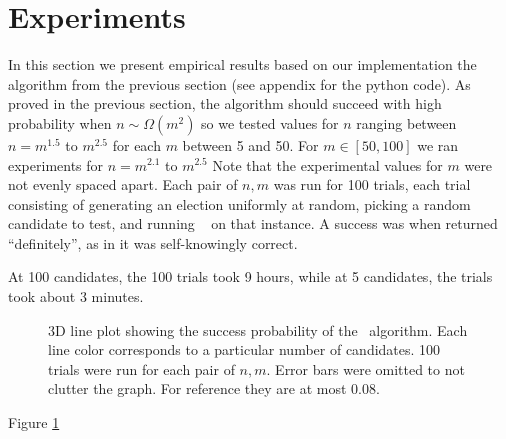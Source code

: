 \section{Experiments}

In this section we present empirical results based on our
implementation the ~ algorithm from the previous section (see appendix for
the python code).
As proved in the previous section, the algorithm should succeed with high
probability when $n \sim \Omega(m^2)$ so we tested values for $n$ ranging between
$n = m^{1.5}$ to $m^{2.5}$ for each $m$ between 5 and 50.
For $m \in [50,100]$ we ran experiments for $n = m^{2.1}$ to $m^{2.5}$
Note that the experimental values for $m$ were not evenly spaced apart.
Each pair of $n,m$ was run for 100 trials, each trial consisting of generating
an election uniformly at random, picking a random candidate to test, and running ~ on that
instance.
A success was when returned ``definitely'', as in it was self-knowingly correct.

At 100 candidates, the 100 trials took 9 hours, while at 5 candidates, the trials
took about 3 minutes.


\begin{figure}[hbt!]\centering
    \hfill
    \caption{3D line plot showing the success probability of the
    ~algorithm. Each line color corresponds to a particular
    number of candidates. 100 trials were run for each pair of $n,m$.
    Error bars were omitted to not clutter the graph. For reference they
    are at most $ 0.08$.}
    \label{fig:exp}
\end{figure}

Figure \ref{fig:exp} 




